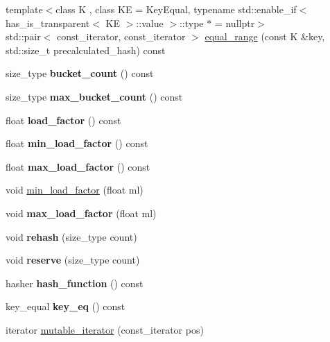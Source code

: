 \begin{DoxyCompactItemize}
\item 
{\footnotesize template$<$class K , class KE  = Key\+Equal, typename std\+::enable\+\_\+if$<$ has\+\_\+is\+\_\+transparent$<$ K\+E $>$\+::value $>$\+::type $\ast$  = nullptr$>$ }\\std\+::pair$<$ const\+\_\+iterator, const\+\_\+iterator $>$ \mbox{\hyperlink{classtsl_1_1robin__set_a2ca1a7918565492dcc5a870186220985}{equal\+\_\+range}} (const K \&key, std\+::size\+\_\+t precalculated\+\_\+hash) const
\item 
\mbox{\label{classtsl_1_1robin__set_a91f7299125dad4881cf1fc8a313cbee7}} 
size\+\_\+type {\bfseries bucket\+\_\+count} () const
\item 
\mbox{\label{classtsl_1_1robin__set_af63a2baee29b4680f49e55f9f8e8b2ab}} 
size\+\_\+type {\bfseries max\+\_\+bucket\+\_\+count} () const
\item 
\mbox{\label{classtsl_1_1robin__set_a5096d0194960278c43b23382b93c9f8f}} 
float {\bfseries load\+\_\+factor} () const
\item 
\mbox{\label{classtsl_1_1robin__set_ac59a301ebfa46d5fcd35ce529008deb5}} 
float {\bfseries min\+\_\+load\+\_\+factor} () const
\item 
\mbox{\label{classtsl_1_1robin__set_afa1e914c188cba804978004b25e39abe}} 
float {\bfseries max\+\_\+load\+\_\+factor} () const
\item 
void \mbox{\hyperlink{classtsl_1_1robin__set_a8a57104ad0c718dcf4a3d94fb94e8cb1}{min\+\_\+load\+\_\+factor}} (float ml)
\item 
\mbox{\label{classtsl_1_1robin__set_a3ecaa65ec84bf3b33aecc891ece46b6a}} 
void {\bfseries max\+\_\+load\+\_\+factor} (float ml)
\item 
\mbox{\label{classtsl_1_1robin__set_a299dc10b59d8fea28916790b3e8c0bdb}} 
void {\bfseries rehash} (size\+\_\+type count)
\item 
\mbox{\label{classtsl_1_1robin__set_ac7d16e96e07b5618cd330b801b822398}} 
void {\bfseries reserve} (size\+\_\+type count)
\item 
\mbox{\label{classtsl_1_1robin__set_af87c41abcb19a1442b4038db6edeeec3}} 
hasher {\bfseries hash\+\_\+function} () const
\item 
\mbox{\label{classtsl_1_1robin__set_a7734224edf25d5342a490f22560a9a04}} 
key\+\_\+equal {\bfseries key\+\_\+eq} () const
\item 
iterator \mbox{\hyperlink{classtsl_1_1robin__set_aebd376e4762e1e4091df9cc19917334e}{mutable\+\_\+iterator}} (const\+\_\+iterator pos)
\end{DoxyCompactItemize}
